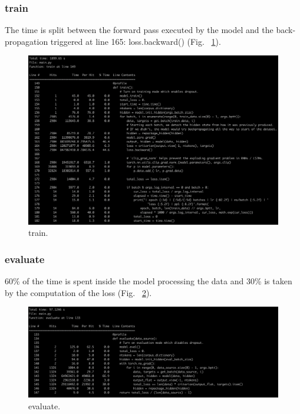 \documentclass[11pt]{article}
\newcommand{\0}{\mat{0}}
\begin{document}
\begin{itemize}
   \subsubsection*{train}
   The time is split between the forward pass executed by the model and the back-propagation triggered at line 165: loss.backward()  (Fig. ~\ref{fig:train}).
   \begin{figure}[h]
  	\centering
 	 \includegraphics[width=\linewidth]{train.png}
 	 \caption{train.}
 	 \label{fig:train}
   \end{figure}


   \subsubsection*{evaluate}
   60\% of the time is spent inside the model processing the data and 30\% is taken by the computation of the loss (Fig. ~\ref{fig:evaluate}).
   \begin{figure}[h!]
  	\centering
 	 \includegraphics[width=\linewidth]{evaluate.png}
 	 \caption{evaluate.}
 	 \label{fig:evaluate}
   \end{figure}


\end{itemize}
\end{document}
